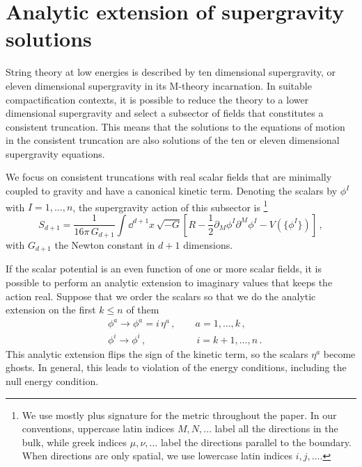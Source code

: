 \section{Analytic extension of supergravity solutions
}\label{sec:analyticext}

String theory at low energies is described by ten dimensional supergravity, or eleven dimensional supergravity in its M-theory incarnation.
In suitable compactification contexts, it is possible to reduce the theory to a lower dimensional supergravity and select a subsector of fields that constitutes a consistent truncation.
This means that the solutions to the equations of motion in the consistent truncation are also solutions of the ten or eleven dimensional supergravity equations.

We focus on consistent truncations with real scalar fields that are minimally coupled to gravity and have a canonical kinetic term.
Denoting the scalars by $\phi^I$ with $I=1,\dots,n$, the supergravity action of this subsector is%
\footnote{We use mostly plus signature for the metric throughout the paper.
In our conventions, uppercase latin indices $M,N,\dots$ label all the directions in the bulk, while greek indices $\mu,\nu,\dots$ label the directions parallel to the boundary.
When directions are only spatial, we use lowercase latin indices $i,j,\dots$.}
\begin{equation}
	S_{d+1}=\frac{1}{16\pi\, G_{d+1}}\int \dd^{d+1} x\, \sqrt{-G}\left[R-\frac{1}{2}\partial_M \phi^I\partial^M\phi^I-V\left(\{\phi^I\}\right)\right]\,,
\end{equation}
with $G_{d+1}$ the Newton constant in $d+1$ dimensions. 

If the scalar potential is an even function of one or more scalar fields, it is possible to perform an analytic extension to imaginary values that keeps the action real.
Suppose that we order the scalars so that we do the analytic extension on the first $k\leq n$ of them
\begin{equation}
\begin{split}
	&\phi^a\to \phi^a =i\, \eta^a
	\,, \qquad  
	a=1,\dots, k
	\,,\\
	&\phi^i\to \phi^i
	\,,\qquad\qquad\quad\,
	i=k+1,\dots,n\,.
\end{split}
\end{equation}
This analytic extension flips the sign of the kinetic term, so the scalars $\eta^a$ become ghosts.
In general, this leads to violation of the energy conditions, including the null energy condition.

